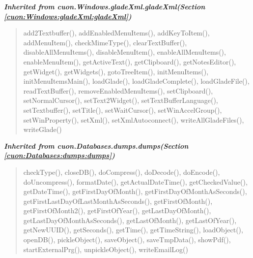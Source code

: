 \large{\textbf{\textit{Inherited from cuon.Windows.gladeXml.gladeXml\textit{(Section \ref{cuon:Windows:gladeXml:gladeXml})}}}}

\begin{quote}
add2Textbuffer(), addEnabledMenuItems(), addKeyToItem(), addMenuItem(), checkMimeType(), clearTextBuffer(), disableAllMenuItems(), disableMenuItem(), enableAllMenuItems(), enableMenuItem(), getActiveText(), getClipboard(), getNotesEditor(), getWidget(), getWidgets(), gotoTreeItem(), initMenuItems(), initMenuItemsMain(), loadGlade(), loadGladeComplete(), loadGladeFile(), readTextBuffer(), removeEnabledMenuItems(), setClipboard(), setNormalCursor(), setText2Widget(), setTextBufferLanguage(), setTextbuffer(), setTitle(), setWaitCursor(), setWinAccelGroup(), setWinProperty(), setXml(), setXmlAutoconnect(), writeAllGladeFiles(), writeGlade()
\end{quote}

\large{\textbf{\textit{Inherited from cuon.Databases.dumps.dumps\textit{(Section \ref{cuon:Databases:dumps:dumps})}}}}

\begin{quote}
checkType(), closeDB(), doCompress(), doDecode(), doEncode(), doUncompress(), formatDate(), getActualDateTime(), getCheckedValue(), getDateTime(), getFirstDayOfMonth(), getFirstDayOfMonthAsSeconds(), getFirstLastDayOfLastMonthAsSeconds(), getFirstOfMonth(), getFirstOfMonth2(), getFirstOfYear(), getLastDayOfMonth(), getLastDayOfMonthAsSeconds(), getLastOfMonth(), getLastOfYear(), getNewUUID(), getSeconds(), getTime(), getTimeString(), loadObject(), openDB(), pickleObject(), saveObject(), saveTmpData(), showPdf(), startExternalPrg(), unpickleObject(), writeEmailLog()
\end{quote}
